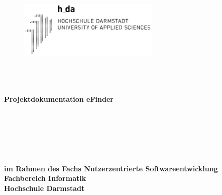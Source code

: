  \thispagestyle{empty}
\begin{titlepage}
	 \thispagestyle{empty}
\begin{center}
	 \thispagestyle{empty}
\begin{figure}[t]
	\centering
	\includegraphics[width=0.6\textwidth]{Hda_logo.svg.png}
	
\end{figure}

$~~$\\
\paragraph{}$~~$\\
\textbf{\huge Projektdokumentation eFinder}\paragraph{}$~~$\\
\paragraph{}$~~$\\
\paragraph{}$~~$\\
\textbf{im Rahmen des Fachs Nutzerzentrierte Softwareentwicklung}\\ \textbf{Fachbereich Informatik}\\ \textbf{Hochschule Darmstadt}
\paragraph{}$~~$\\

\end{center}
\end{titlepage}
